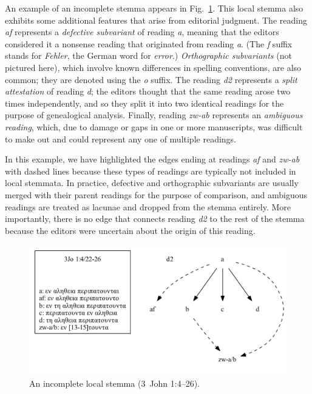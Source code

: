 \documentclass[a4paper, 12pt]{article}
\begin{document}
	An example of an incomplete stemma appears in Fig.~\ref{fig:local-stemma-incomplete}. This local stemma also exhibits some additional features that arise from editorial judgment. The reading \emph{af} represents a \emph{defective subvariant} of reading \emph{a}, meaning that the editors considered it a nonsense reading that originated from reading \emph{a}. (The \emph{f} suffix stands for \emph{Fehler}, the German word for \emph{error}.) \emph{Orthographic subvariants} (not pictured here), which involve known differences in spelling conventions, are also common; they are denoted using the \emph{o} suffix. The reading \emph{d2} represents a \emph{split attestation} of reading \emph{d}; the editors thought that the same reading arose two times independently, and so they split it into two identical readings for the purpose of genealogical analysis. Finally, reading \emph{zw-a\ForwardSlash b} represents an \emph{ambiguous reading}, which, due to damage or gaps in one or more manuscripts, was difficult to make out and could represent any one of multiple readings.
	
	In this example, we have highlighted the edges ending at readings \emph{af} and \emph{zw-a\ForwardSlash b} with dashed lines because these types of readings are typically not included in local stemmata. In practice, defective and orthographic subvariants are usually merged with their parent readings for the purpose of comparison, and ambiguous readings are treated as lacunae and dropped from the stemma entirely. More importantly, there is no edge that connects reading \emph{d2} to the rest of the stemma because the editors were uncertain about the origin of this reading.
	
	\begin{figure}[h!]
		\centering
		\includegraphics[scale=0.6666]{../graphics/B25K1V4U22-26-local-stemma.pdf}
		\caption{An incomplete local stemma (3~John 1:4–26).}
		\label{fig:local-stemma-incomplete}
	\end{figure}
	
\end{document}
